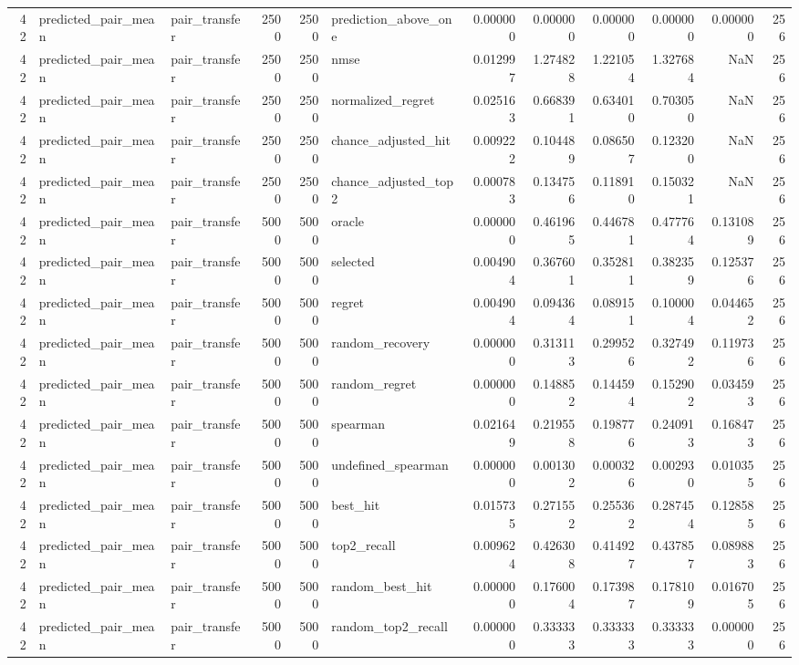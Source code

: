 \begin{tabular}{rllrrlrrrrrr}
42 & predicted_pair_mean & pair_transfer & 2500 & 2500 & prediction_above_one & 0.000000 & 0.000000 & 0.000000 & 0.000000 & 0.000000 & 256 \\
42 & predicted_pair_mean & pair_transfer & 2500 & 2500 & nmse & 0.012997 & 1.274828 & 1.221054 & 1.327684 & NaN & 256 \\
42 & predicted_pair_mean & pair_transfer & 2500 & 2500 & normalized_regret & 0.025163 & 0.668391 & 0.634010 & 0.703050 & NaN & 256 \\
42 & predicted_pair_mean & pair_transfer & 2500 & 2500 & chance_adjusted_hit & 0.009222 & 0.104489 & 0.086507 & 0.123200 & NaN & 256 \\
42 & predicted_pair_mean & pair_transfer & 2500 & 2500 & chance_adjusted_top2 & 0.000783 & 0.134756 & 0.118910 & 0.150321 & NaN & 256 \\
42 & predicted_pair_mean & pair_transfer & 5000 & 5000 & oracle & 0.000000 & 0.461965 & 0.446781 & 0.477764 & 0.131089 & 256 \\
42 & predicted_pair_mean & pair_transfer & 5000 & 5000 & selected & 0.004904 & 0.367601 & 0.352811 & 0.382359 & 0.125376 & 256 \\
42 & predicted_pair_mean & pair_transfer & 5000 & 5000 & regret & 0.004904 & 0.094364 & 0.089151 & 0.100004 & 0.044652 & 256 \\
42 & predicted_pair_mean & pair_transfer & 5000 & 5000 & random_recovery & 0.000000 & 0.313113 & 0.299526 & 0.327492 & 0.119736 & 256 \\
42 & predicted_pair_mean & pair_transfer & 5000 & 5000 & random_regret & 0.000000 & 0.148852 & 0.144594 & 0.152902 & 0.034593 & 256 \\
42 & predicted_pair_mean & pair_transfer & 5000 & 5000 & spearman & 0.021649 & 0.219558 & 0.198776 & 0.240913 & 0.168473 & 256 \\
42 & predicted_pair_mean & pair_transfer & 5000 & 5000 & undefined_spearman & 0.000000 & 0.001302 & 0.000326 & 0.002930 & 0.010355 & 256 \\
42 & predicted_pair_mean & pair_transfer & 5000 & 5000 & best_hit & 0.015735 & 0.271552 & 0.255362 & 0.287454 & 0.128585 & 256 \\
42 & predicted_pair_mean & pair_transfer & 5000 & 5000 & top2_recall & 0.009624 & 0.426308 & 0.414927 & 0.437857 & 0.089883 & 256 \\
42 & predicted_pair_mean & pair_transfer & 5000 & 5000 & random_best_hit & 0.000000 & 0.176004 & 0.173987 & 0.178109 & 0.016705 & 256 \\
42 & predicted_pair_mean & pair_transfer & 5000 & 5000 & random_top2_recall & 0.000000 & 0.333333 & 0.333333 & 0.333333 & 0.000000 & 256 \\

\end{tabular}

